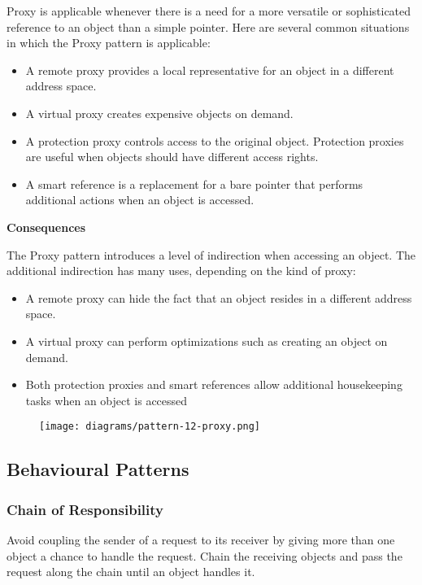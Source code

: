 \documentclass{article}
\begin{document}
Proxy is applicable whenever there is a need for a more versatile or sophisticated reference to an object than a simple pointer. Here are several common situations in which the Proxy pattern is applicable:
\begin{itemize}
    \item A remote proxy provides a local representative for an object in a different address space.
    \item A virtual proxy creates expensive objects on demand.
    \item A protection proxy controls access to the original object. Protection proxies are useful when objects should have different access rights.
    \item A smart reference is a replacement for a bare pointer that performs additional actions when an object is accessed.
\end{itemize}

\textbf{Consequences}

The Proxy pattern introduces a level of indirection when accessing an object. The additional indirection has many uses, depending on the kind of proxy:
\begin{itemize}
    \item A remote proxy can hide the fact that an object resides in a different address space.
    \item A virtual proxy can perform optimizations such as creating an object on demand.
    \item Both protection proxies and smart references allow additional housekeeping tasks when an object is accessed
\end{itemize}

\begin{figure}[h]
    \centering
    \texttt{[image: diagrams/pattern-12-proxy.png]}
\end{figure}

\newpage
\subsection{Behavioural Patterns}
\subsubsection{Chain of Responsibility}
Avoid coupling the sender of a request to its receiver by giving more than one object a chance to handle the request. Chain the receiving objects and pass the request along the chain until an object handles it.
\end{document}
